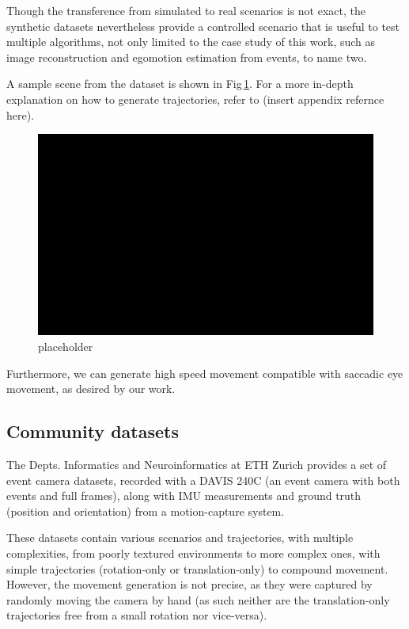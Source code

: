 \documentclass[10pt,twocolumn]{IEEEtran}
\begin{document}
Though the transference from simulated to real scenarios is not exact, the synthetic datasets nevertheless provide a controlled scenario that is useful to test multiple algorithms, not only limited to the case study of this work, such as image reconstruction and egomotion estimation from events, to name two.

A sample scene from the dataset is shown in Fig\,\ref{fig:w13_synthetic}. For a more in-depth explanation on how to generate trajectories, refer to (insert appendix refernce here).

\begin{figure}[ht]
    \centering
    \includegraphics[width = 1\linewidth]{placeholder.png}
    \caption[]{placeholder}
    \label{fig:w13_synthetic}
\end{figure}

Furthermore, we can generate high speed movement compatible with saccadic eye movement, as desired by our work.

\subsection{Community datasets}
\label{sec:w13_datasets}

The Depts. Informatics and Neuroinformatics at ETH Zurich provides a set of event camera datasets, recorded with a DAVIS 240C (an event camera with both events and full frames), along with IMU measurements and ground truth  (position and orientation) from a motion-capture system. 

These datasets contain various scenarios and trajectories, with multiple complexities, from poorly textured environments to more complex ones, with simple trajectories (rotation-only or translation-only) to compound movement. However, the movement generation is not precise, as they were captured by randomly moving the camera by hand (as such neither are the translation-only trajectories free from a small rotation nor vice-versa). 
\end{document}
